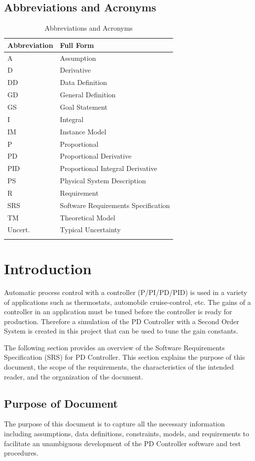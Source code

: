 \documentclass[12pt]{article}
\begin{document}
\subsection{Abbreviations and Acronyms}
\label{Sec:TAbbAcc}
\begin{longtable}{l l}
\toprule
\textbf{Abbreviation} & \textbf{Full Form}
\\
\midrule
\endhead
A & Assumption
\\
D & Derivative
\\
DD & Data Definition
\\
GD & General Definition
\\
GS & Goal Statement
\\
I & Integral
\\
IM & Instance Model
\\
P & Proportional
\\
PD & Proportional Derivative
\\
PID & Proportional Integral Derivative
\\
PS & Physical System Description
\\
R & Requirement
\\
SRS & Software Requirements Specification
\\
TM & Theoretical Model
\\
Uncert. & Typical Uncertainty
\\
\bottomrule
\caption{Abbreviations and Acronyms}
\label{Table:TAbbAcc}
\end{longtable}
\section{Introduction}
\label{Sec:Intro}
Automatic process control with a controller (P/PI/PD/PID) is used in a variety of applications such as thermostats, automobile cruise-control, etc. The gains of a controller in an application must be tuned before the controller is ready for production. Therefore a simulation of the PD Controller with a Second Order System is created in this project that can be used to tune the gain constants.

The following section provides an overview of the Software Requirements Specification (SRS) for PD Controller. This section explains the purpose of this document, the scope of the requirements, the characteristics of the intended reader, and the organization of the document.

\subsection{Purpose of Document}
\label{Sec:DocPurpose}
The purpose of this document is to capture all the necessary information including assumptions, data definitions, constraints, models, and requirements to facilitate an unambiguous development of the PD Controller software and test procedures.
\end{document}
